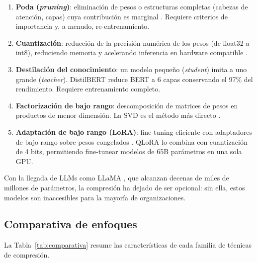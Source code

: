 \documentclass[11pt, a4paper]{article}
\begin{document}
\begin{enumerate}[nosep]
    \item \textbf{Poda (\textit{pruning})}: eliminación de pesos o estructuras completas (cabezas de atención, capas) cuya contribución es marginal \cite{han2015deep, wang2019structured}. Requiere criterios de importancia y, a menudo, re-entrenamiento.
    \item \textbf{Cuantización}: reducción de la precisión numérica de los pesos (de float32 a int8), reduciendo memoria y acelerando inferencia en hardware compatible \cite{jacob2018quantization}.
    \item \textbf{Destilación del conocimiento}: un modelo pequeño (\textit{student}) imita a uno grande (\textit{teacher}). DistilBERT \cite{sanh2019distilbert} reduce BERT a 6 capas conservando el 97\% del rendimiento. Requiere entrenamiento completo.
    \item \textbf{Factorización de bajo rango}: descomposición de matrices de pesos en productos de menor dimensión. La SVD es el método más directo \cite{jaderberg2014speeding, noach2020compressing, hsu2022language}.
    \item \textbf{Adaptación de bajo rango (LoRA)}: fine-tuning eficiente con adaptadores de bajo rango sobre pesos congelados \cite{hu2022lora}. QLoRA \cite{dettmers2023qlora} lo combina con cuantización de 4 bits, permitiendo fine-tunear modelos de 65B parámetros en una sola GPU.
\end{enumerate}

Con la llegada de LLMs como LLaMA \cite{touvron2023llama}, que alcanzan decenas de miles de millones de parámetros, la compresión ha dejado de ser opcional: sin ella, estos modelos son inaccesibles para la mayoría de organizaciones.

\subsection{Comparativa de enfoques}

La Tabla~\ref{tab:comparativa} resume las características de cada familia de técnicas de compresión.
\end{document}
